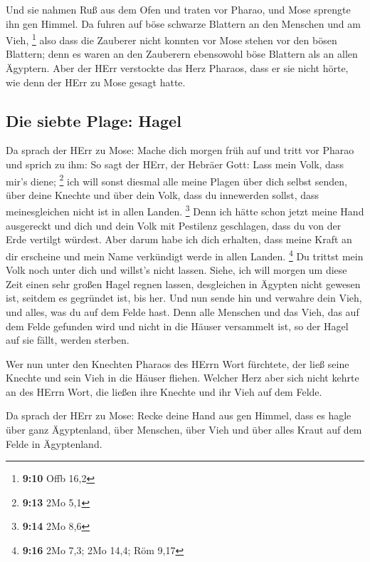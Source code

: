  Und sie nahmen Ruß aus dem Ofen und traten vor Pharao,
und Mose sprengte ihn gen Himmel. Da fuhren auf böse schwarze Blattern
an den Menschen und am Vieh, \footnote{\textbf{9:10} Offb 16,2}
 also dass die Zauberer nicht konnten vor Mose stehen vor
den bösen Blattern; denn es waren an den Zauberern ebensowohl böse
Blattern als an allen Ägyptern.  Aber der HErr verstockte
das Herz Pharaos, dass er sie nicht hörte, wie denn der HErr zu Mose
gesagt hatte.

\hypertarget{die-siebte-plage-hagel}{%
\subsection{Die siebte Plage: Hagel}\label{die-siebte-plage-hagel}}

 Da sprach der HErr zu Mose: Mache dich morgen früh auf
und tritt vor Pharao und sprich zu ihm: So sagt der HErr, der Hebräer
Gott: Lass mein Volk, dass mir's diene; \footnote{\textbf{9:13} 2Mo 5,1}
 ich will sonst diesmal alle meine Plagen über dich
selbst senden, über deine Knechte und über dein Volk, dass du innewerden
sollst, dass meinesgleichen nicht ist in allen Landen. \footnote{\textbf{9:14}
  2Mo 8,6}  Denn ich hätte schon jetzt meine Hand
ausgereckt und dich und dein Volk mit Pestilenz geschlagen, dass du von
der Erde vertilgt würdest.  Aber darum habe ich dich
erhalten, dass meine Kraft an dir erscheine und mein Name verkündigt
werde in allen Landen. \footnote{\textbf{9:16} 2Mo 7,3; 2Mo 14,4; Röm
  9,17}  Du trittst mein Volk noch unter dich und
willst's nicht lassen.  Siehe, ich will morgen um diese
Zeit einen sehr großen Hagel regnen lassen, desgleichen in Ägypten nicht
gewesen ist, seitdem es gegründet ist, bis her.  Und nun
sende hin und verwahre dein Vieh, und alles, was du auf dem Felde hast.
Denn alle Menschen und das Vieh, das auf dem Felde gefunden wird und
nicht in die Häuser versammelt ist, so der Hagel auf sie fällt, werden
sterben.

 Wer nun unter den Knechten Pharaos des HErrn Wort
fürchtete, der ließ seine Knechte und sein Vieh in die Häuser fliehen.
 Welcher Herz aber sich nicht kehrte an des HErrn Wort,
die ließen ihre Knechte und ihr Vieh auf dem Felde.

 Da sprach der HErr zu Mose: Recke deine Hand aus gen
Himmel, dass es hagle über ganz Ägyptenland, über Menschen, über Vieh
und über alles Kraut auf dem Felde in Ägyptenland.

